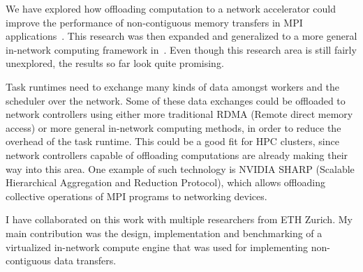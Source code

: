 We have explored how offloading computation to a network accelerator could improve the
performance of non-contiguous memory transfers in MPI applications~\cite{spin}. This
research was then expanded and generalized to a more general in-network computing framework
in~\cite{spin2}. Even though this research area is still fairly unexplored, the results so far
look quite promising.

Task runtimes need to exchange many kinds of data amongst workers and the scheduler over
the network. Some of these data exchanges could be offloaded to network controllers using either
more traditional RDMA (Remote direct memory access) or more general in-network computing
methods, in order to reduce the overhead of the task runtime. This could be a good fit for HPC
clusters, since network controllers capable of offloading computations are already making their
way into this area. One example of such technology is NVIDIA SHARP (Scalable Hierarchical
Aggregation and Reduction Protocol), which allows offloading collective operations of MPI
programs to networking devices.

I have collaborated on this work with multiple researchers from ETH Zurich. My main
contribution was the design, implementation and benchmarking of a virtualized in-network compute
engine that was used for implementing non-contiguous data transfers.
